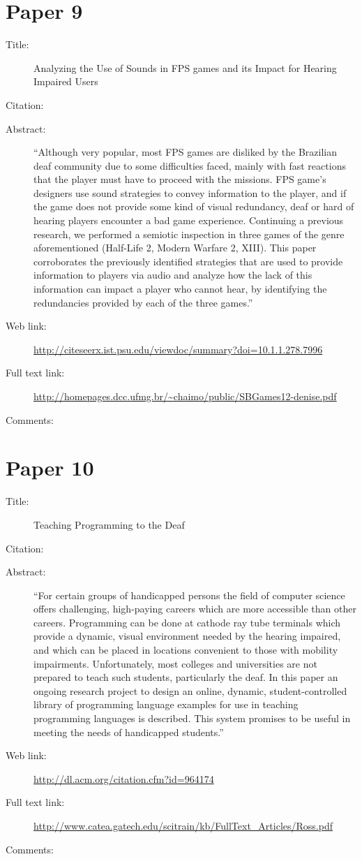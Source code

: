 \documentclass{scrartcl}
\begin{document}
\section*{Paper 9}
\begin{description}
\item[Title:] Analyzing the Use of Sounds in FPS games and its Impact for Hearing Impaired Users
\item[Citation:] \cite{Denise}
\item[Abstract:] ``Although very popular, most FPS games are disliked by the Brazilian deaf community due to some difficulties faced, mainly with fast reactions that the player must have to proceed with the missions. FPS game’s designers use sound strategies to convey information to the player, and if the game does not provide some kind of visual redundancy, deaf or hard of hearing players encounter a bad game experience. Continuing a previous research, we performed a semiotic inspection in three games of the genre aforementioned (Half-Life 2, Modern Warfare 2, XIII). This paper corroborates the previously identified strategies that are used to provide information to players via audio and analyze how the lack of this information can impact a player who cannot hear, by identifying the redundancies provided by each of the three games.''
\item[Web link:] \url {http://citeseerx.ist.psu.edu/viewdoc/summary?doi=10.1.1.278.7996}
\item[Full text link:] \url {http://homepages.dcc.ufmg.br/~chaimo/public/SBGames12-denise.pdf}
\item[Comments:] 
\end{description}

\section*{Paper 10}
\begin{description}
\item[Title:] Teaching Programming to the Deaf
\item[Citation:] \cite{Ross}
\item[Abstract:] ``For certain groups of handicapped persons the field of computer science offers challenging, high-paying careers which are more accessible than other careers. Programming can be done at cathode ray tube terminals which provide a dynamic, visual environment needed by the hearing impaired, and which can be placed in locations convenient to those with mobility impairments. Unfortunately, most colleges and universities are not prepared to teach such students, particularly the deaf. In this paper an ongoing research project to design an online, dynamic, student-controlled library of programming language examples for use in teaching programming languages is described. This system promises to be useful in meeting the needs of handicapped students.''
\item[Web link:] \url {http://dl.acm.org/citation.cfm?id=964174}
\item[Full text link:] \url {http://www.catea.gatech.edu/scitrain/kb/FullText_Articles/Ross.pdf}
\item[Comments:]
\end{description}
\end{document}
